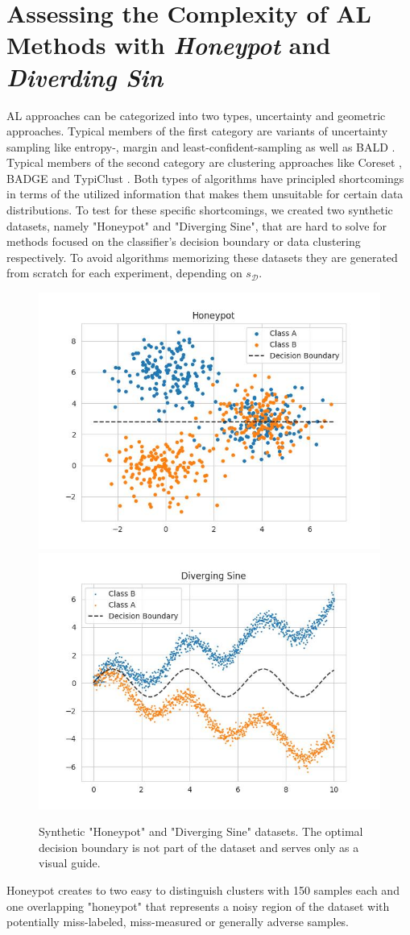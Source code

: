 \documentclass[]{article}
\newcommand{\D}{\mathcal{D}}
\begin{document}
\section{Assessing the Complexity of AL Methods with \emph{Honeypot} and
\emph{Diverding Sin}}
AL approaches can be categorized into two types, uncertainty and geometric approaches.
Typical members of the first category are variants of uncertainty sampling like entropy-, margin and least-confident-sampling \cite{wang2014new} as well as BALD \cite{gal2017deep}.
Typical members of the second category are clustering approaches like Coreset \cite{sener2017active}, BADGE \cite{ashdeep} and TypiClust \cite{hacohen2022active}.
Both types of algorithms have principled shortcomings in terms of the utilized information that makes them unsuitable for certain data distributions. 
To test for these specific shortcomings, we created two synthetic datasets, namely "Honeypot" and "Diverging Sine", that are hard to solve for methods focused on the classifier's decision boundary or data clustering respectively. 
To avoid algorithms memorizing these datasets they are generated from scratch for each experiment, depending on $s_\D$. \\
\begin{figure}[]
	\centering
	\includegraphics[width=0.4\linewidth]{img/honeypot.jpg}
	\includegraphics[width=0.4\linewidth]{img/diverging_sin.jpg}
	\caption{Synthetic "Honeypot" and "Diverging Sine" datasets. The optimal decision boundary is not part of the dataset and serves only as a visual guide.}
	\label{fig:synthDataAppendix}
\end{figure}
%
Honeypot creates to two easy to distinguish clusters with 150 samples each and one overlapping "honeypot" that represents a noisy region of the dataset with potentially miss-labeled, miss-measured or generally adverse samples.
\end{document}
